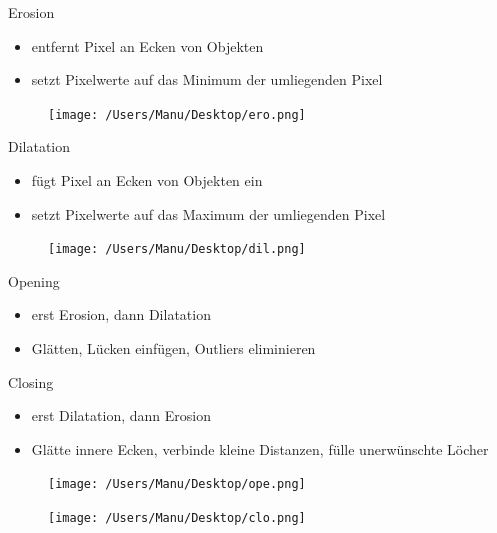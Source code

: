 \documentclass[paper=a4, fontsize=11pt]{scrartcl} %
\numberwithin{equation}{section} %
\numberwithin{figure}{section} %
\numberwithin{table}{section} %
\begin{document}
\begin{itemize}
\item Erosion\\
\begin{minipage}{0.5\textwidth}
\begin{itemize}
\item entfernt Pixel an Ecken von Objekten
\item setzt Pixelwerte auf das Minimum der umliegenden Pixel
\end{itemize}
\end{minipage} \hfill
\begin{minipage}{0.45\textwidth}
\begin{figure}[H]
\texttt{[image: /Users/Manu/Desktop/ero.png]}
\end{figure}
\end{minipage}
\item Dilatation\\
\begin{minipage}{0.5\textwidth}
\begin{itemize}
\item fügt Pixel an Ecken von Objekten ein
\item setzt Pixelwerte auf das Maximum der umliegenden Pixel
\end{itemize}
\end{minipage} \hfill
\begin{minipage}{0.45\textwidth}
\begin{figure}[H]
\texttt{[image: /Users/Manu/Desktop/dil.png]}
\end{figure}
\end{minipage}
\begin{minipage}{0.5\textwidth}
\item Opening
\begin{itemize}
\item erst Erosion, dann Dilatation
\item Glätten, Lücken einfügen, Outliers eliminieren
\end{itemize}
\item Closing
\begin{itemize}
\item erst Dilatation, dann Erosion
\item Glätte innere Ecken, verbinde kleine Distanzen, fülle unerwünschte Löcher
\end{itemize}
\end{minipage} \hfill
\begin{minipage}{0.2\textwidth}
\begin{figure}[H]
\texttt{[image: /Users/Manu/Desktop/ope.png]}
\end{figure}
\end{minipage} \hfill
\begin{minipage}{0.2\textwidth}
\begin{figure}[H]
\texttt{[image: /Users/Manu/Desktop/clo.png]}
\end{figure}
\end{minipage}
\end{itemize}
\end{document}
